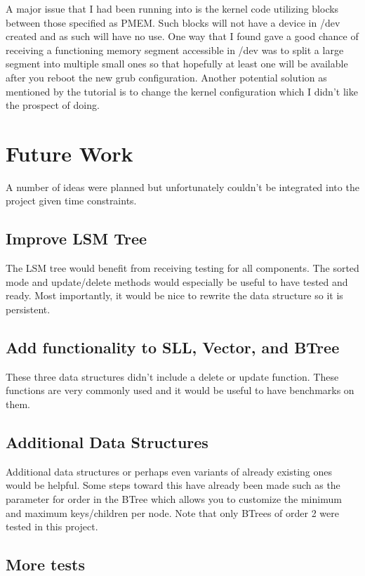 \documentclass[twocolumn]{article}
\begin{document}
A major issue that I had been running into is the kernel code utilizing blocks
between those specified as PMEM. Such blocks will not have a device in
/dev created and as such will have no use. One way that I found gave a good
chance of receiving a functioning memory segment accessible in /dev was to split
a large segment into multiple small ones so that hopefully at least one will be
available after you reboot the new grub configuration. Another potential
solution as mentioned by the tutorial is to change the kernel configuration
which I didn't like the prospect of doing.

\section{Future Work}

A number of ideas were planned but unfortunately couldn't be integrated into the
project given time constraints.

\subsection{Improve LSM Tree}

The LSM tree would benefit from receiving testing for all components. The sorted
mode and update/delete methods would especially be useful to have tested and
ready. Most importantly, it would be nice to rewrite the data structure so it
is persistent.

\subsection{Add functionality to SLL, Vector, and BTree}

These three data structures didn't include a delete or update function. These
functions are very commonly used and it would be useful to have benchmarks on
them.

\subsection{Additional Data Structures}

Additional data structures or perhaps even variants of already existing ones
would be helpful. Some steps toward this have already been made such as the
parameter for order in the BTree which allows you to customize the minimum and
maximum keys/children per node. Note that only BTrees of order 2 were tested in
this project.

\subsection{More tests}
\end{document}
